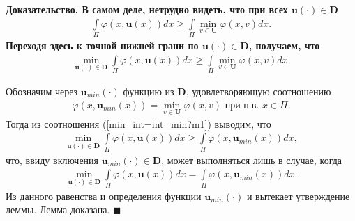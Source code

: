 \documentclass{report}
\newenvironment{Proof}{\par\noindent\bf Доказательство.\rm}{ $\blacksquare$\par}
\begin{document}
\begin{Proof}
В самом деле, нетрудно видеть, что при всех $\mathbf{u}(\cdot)\in\mathbf{D}$
\begin{gather*}
\int\limits_\Pi\varphi(x,\mathbf{u}(x))dx\geqslant\int\limits_\Pi\min\limits_{v\in\mathbf{U}}\varphi(x,v)dx.
\end{gather*}
Переходя здесь к точной нижней грани по $\mathbf{u}(\cdot)\in\mathbf{D}$, получаем, что
\begin{gather}\label{min_int=int_min?m1}
\min\limits_{\mathbf{u}(\cdot)\in\mathbf{D}}\int\limits_\Pi\varphi(x,\mathbf{u}(x))dx\geqslant\int\limits_\Pi\min\limits_{v\in\mathbf{U}}\varphi(x,v)dx.
\end{gather}

Обозначим через $\mathbf{u}_{min}(\cdot)$ функцию из $\mathbf{D}$, удовлетворяющую соотношению
\begin{gather*}
\varphi(x,\mathbf{u}_{min}(x))=\min\limits_{v\in\mathbf{U}}\varphi(x,v)\text{ при п.в. $x\in\Pi$}.
\end{gather*}
Тогда из соотношения (\ref{min_int=int_min?m1}) выводим, что
\begin{gather*}
\min\limits_{\mathbf{u}(\cdot)\in\mathbf{D}}\int\limits_\Pi\varphi(x,\mathbf{u}(x))dx\geqslant\int\limits_\Pi\varphi(x,\mathbf{u}_{min}(x))dx,
\end{gather*}
что, ввиду включения $\mathbf{u}_{min}(\cdot)\in\mathbf{D}$, может выполняться лишь в случае, когда
\begin{gather*}
\min\limits_{\mathbf{u}(\cdot)\in\mathbf{D}}\int\limits_\Pi\varphi(x,\mathbf{u}(x))dx=\int\limits_\Pi\varphi(x,\mathbf{u}_{min}(x))dx.
\end{gather*}
Из данного равенства и определения функции $\mathbf{u}_{min}(\cdot)$ и вытекает утверждение леммы. Лемма доказана.
\end{Proof}
\end{document}

